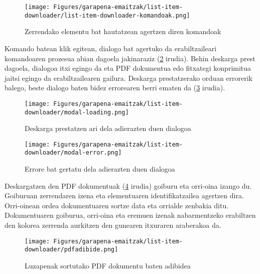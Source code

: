 \begin{figure}[H]
\centering
\texttt{[image: Figures/garapena-emaitzak/list-item-downloader/list-item-downloader-komandoak.png]}
\caption{Zerrendako elementu bat hautatzean agertzen diren komandoak}
\label{item-download-commands}
\end{figure}

Komando batean klik egitean, dialogo bat agertuko da erabiltzaileari komandoaren prozesua abian dagoela jakinaraziz (\ref{list-item-dialog-loading} irudia). Behin deskarga prest dagoela, dialogoa itxi egingo da eta PDF dokumentua edo fitxategi konprimitua jaitsi egingo da erabiltzailearen gailura. Deskarga prestatzerako orduan errorerik balego, beste dialogo baten bidez errorearen berri ematen da  (\ref{list-item-dialog-error} irudia).

\begin{figure}[H]
\centering
\texttt{[image: Figures/garapena-emaitzak/list-item-downloader/modal-loading.png]}
\caption{Deskarga prestatzen ari dela adierazten duen dialogoa}
\label{list-item-dialog-loading}
\end{figure}

\begin{figure}[H]
\centering
\texttt{[image: Figures/garapena-emaitzak/list-item-downloader/modal-error.png]}
\caption{Errore bat gertatu dela adierazten duen dialogoa}
\label{list-item-dialog-error}
\end{figure}

Deskargatzen den PDF dokumentuak (\ref{item-download-pdf} irudia) goiburu eta orri-oina izango du. Goiburuan zerrendaren izena eta elementuaren identifikatzailea agertzen dira. Orri-oinean ordea dokumentuaren sortze data eta orrialde zenbakia ditu.
Dokumentuaren goiburua, orri-oina eta eremuen izenak nabarmentzeko erabiltzen den kolorea zerrenda aurkitzen den gunearen itxuraren araberakoa da. 

\begin{figure}[H]
\centering
\texttt{[image: Figures/garapena-emaitzak/list-item-downloader/pdfadibide.png]}
\caption{Luzapenak sortutako PDF dokumentu baten adibidea}
\label{item-download-pdf}
\end{figure}


